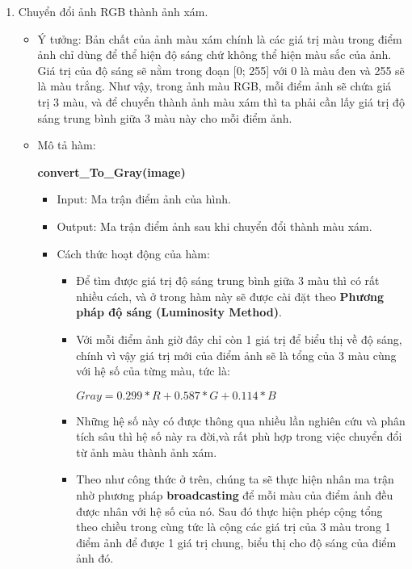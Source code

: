 \documentclass{report}
\begin{document}
\begin{enumerate}
        \pagebreak
        \item Chuyển đổi ảnh RGB thành ảnh xám.
            \begin{itemize}
                \item Ý tưởng: Bản chất của ảnh màu xám chính là các giá trị màu trong điểm ảnh chỉ dùng để thể hiện độ sáng chứ không thể hiện màu sắc của ảnh. Giá trị của độ sáng sẽ nằm trong đoạn [0; 255] với 0 là màu đen và 255 sẽ là màu trắng. Như vậy, trong ảnh màu RGB, mỗi điểm ảnh sẽ chứa giá trị 3 màu, và để chuyển thành ảnh màu xám thì ta phải cần lấy giá trị độ sáng trung bình giữa 3 màu này cho mỗi điểm ảnh.

                \item Mô tả hàm:
                \begin{center}
                \textbf{convert\_To\_Gray(image)}
                \end{center}
                    \begin{itemize}
                        \item Input: Ma trận điểm ảnh của hình.
                        \item Output: Ma trận điểm ảnh sau khi chuyển đổi thành màu xám.
                        \item Cách thức hoạt động của hàm:
                        \begin{itemize}
                            \item Để tìm được giá trị độ sáng trung bình giữa 3 màu thì có rất nhiều cách, và ở trong hàm này sẽ được cài đặt theo \textbf{Phương pháp độ sáng (Luminosity Method)}.
                            \item Với mỗi điểm ảnh giờ đây chỉ còn 1 giá trị để biểu thị về độ sáng, chính vì vậy giá trị mới của điểm ảnh sẽ là tổng của 3 màu cùng với hệ số của từng màu, tức là:
                            \begin{center}
                                $Gray = 0.299 * R + 0.587 * G + 0.114 * B$    
                            \end{center}
                            \item Những hệ số này có được thông qua nhiều lần nghiên cứu và phân tích sâu thì hệ số này ra đời,và rất phù hợp trong việc chuyển đổi từ ảnh màu thành ảnh xám.
                            \item Theo như công thức ở trên, chúng ta sẽ thực hiện nhân ma trận nhờ phương pháp \textbf{broadcasting} để mỗi màu của điểm ảnh đều được nhân với hệ số của nó. Sau đó thực hiện phép cộng tổng theo chiều trong cùng tức là cộng các giá trị của 3 màu trong 1 điểm ảnh để được 1 giá trị chung, biểu thị cho độ sáng của điểm ảnh đó.

\end{itemize}
\end{itemize}
\end{itemize}
\end{enumerate}
\end{document}
